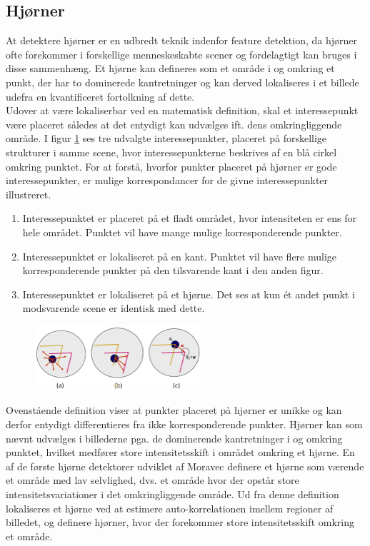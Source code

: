 \subsection{Hjørner}\label{subsec:corner}
At detektere hjørner er en udbredt teknik indenfor feature detektion, da hjørner ofte forekommer i forskellige menneskeskabte scener og fordelagtigt kan bruges i disse sammenhæng. Et hjørne kan defineres som et område i og omkring et punkt, der har to dominerede kantretninger og kan derved lokaliseres i et billede udefra en kvantificeret fortolkning af dette. \\ Udover at være lokaliserbar ved en matematisk definition, skal et interessepunkt være placeret således at det entydigt kan udvælges ift. dens omkringliggende område. I figur \ref{app} ses tre udvalgte interessepunkter, placeret på forskellige strukturer i samme scene, hvor interessepunkterne beskrives af en blå cirkel omkring punktet. For at forstå, hvorfor punkter placeret på hjørner er gode interessepunkter, er mulige korrespondancer for de givne interessepunkter illustreret.
\begin{enumerate}[label=\alph*]
\item{Interessepunktet er placeret på et fladt området, hvor intensiteten er ens for hele området. Punktet vil have mange mulige korresponderende punkter.}
\item{Interessepunktet er lokaliseret på en kant. Punktet vil have flere mulige korresponderende punkter på den tilsvarende kant i den anden figur.}
\item{Interessepunktet er lokaliseret på et hjørne. Det ses at kun ét andet punkt i modsvarende scene er identisk med dette.}
\end{enumerate}
\begin{figure}[H]
    \centering
    \includegraphics[width=0.55\textwidth]{fig/37.png}
    \vspace{-1em}   
    \begin{center}    
    \caption{\textcolor{gray}{\footnotesize \textit{
 }}}
    \label{app}
     \end{center}
    \vspace{-2.7em}  
  \end{figure}  
\noindent
Ovenstående definition viser at punkter placeret på hjørner er unikke og kan derfor entydigt differentieres fra ikke korresponderende punkter. Hjørner kan som nævnt udvælges i billederne pga. de dominerende kantretninger i og omkring punktet, hvilket medfører store intensitetsskift i området omkring et hjørne. En af de første hjørne detektorer udviklet af Moravec \cite{Moravec} 
definere et hjørne som værende et område med lav selvlighed, dvs. et område hvor der opstår store intensitetsvariationer i det omkringliggende område. Ud fra denne definition lokaliseres et hjørne ved at estimere auto-korrelationen imellem regioner af billedet, og definere hjørner, hvor der forekommer store intensitetsskift omkring et område.